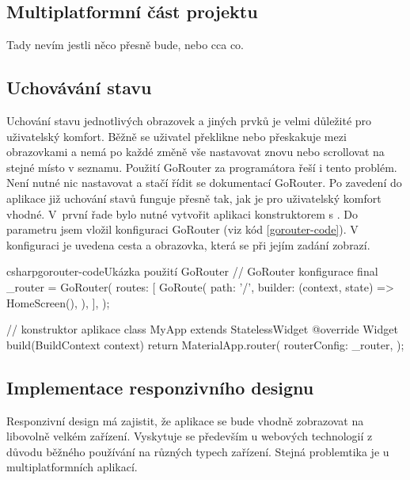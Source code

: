 \documentclass[
  biblatex,
  figures=true,
  tables=false,
  glossaries,
  index
]{kidiplom}
\begin{document}
\subsection{Multiplatformní část projektu}
Tady nevím jestli něco přesně bude, nebo cca co.

\subsection{Uchovávání stavu}
Uchování stavu jednotlivých obrazovek a jiných prvků je velmi důležité pro uživatelský komfort. Běžně se uživatel překlikne nebo přeskakuje mezi obrazovkami a nemá po každé změně vše nastavovat znovu nebo scrollovat na stejné místo v seznamu. Použití GoRouter za programátora řeší i tento problém. Není nutné nic nastavovat a stačí řídit se dokumentací GoRouter. Po zavedení do aplikace již uchování stavů funguje přesně tak, jak je pro uživatelský komfort vhodné. V~první řade bylo nutné vytvořit aplikaci konstruktorem s . Do parametru  jsem vložil konfiguraci GoRouter (viz kód \ref{gorouter-code}). V konfiguraci je uvedena cesta a obrazovka, která se při jejím zadání zobrazí.

\begin{kicode}{csharp}{gorouter-code}{Ukázka použití GoRouter}
  // GoRouter konfigurace
  final _router = GoRouter(
    routes: [
      GoRoute(
        path: '/',
        builder: (context, state) => HomeScreen(),
      ),
    ],
  );

  // konstruktor aplikace
  class MyApp extends StatelessWidget {
    @override
    Widget build(BuildContext context) {
      return MaterialApp.router(
        routerConfig: _router,
      );
    }
  }
\end{kicode}

\subsection{Implementace responzivního designu}
Responzivní design má zajistit, že aplikace se bude vhodně zobrazovat na libovolně velkém zařízení. Vyskytuje se především u webových technologií z důvodu běžného používání na různých typech zařízení. Stejná problemtika je u multiplatformních aplikací.
\end{document}
